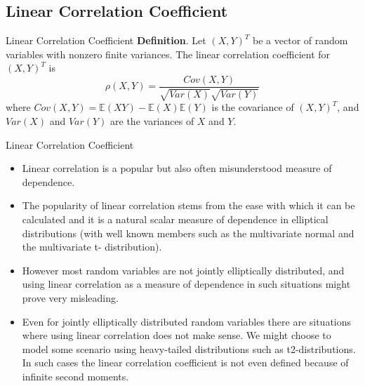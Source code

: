 \documentclass[11pt]{beamer}
\theoremstyle{plain}
\theoremstyle{definition}
\theoremstyle{remark}
\begin{document}
\subsection{Linear Correlation Coefficient}
%
\begin{frame}{Linear Correlation Coefficient}
		\textbf{Definition}. Let $(X,Y)^T$ be a vector of random variables with nonzero finite variances. The linear correlation coefficient 
		for $(X,Y)^T$ is
		\begin{equation}
			\rho(X,Y) = \frac{Cov(X,Y)}{\sqrt{Var(X)}\sqrt{Var(Y)}}
		\end{equation}	
		where $Cov(X,Y) = \mathbb{E}(XY) -\mathbb{E}(X)\mathbb{E}(Y)$ is the covariance of $(X,Y)^T$, and $Var(X)$ and
		$Var(Y)$ are the variances of $X$ and $Y$. %
\end{frame}
%
\begin{frame}{Linear Correlation Coefficient}
   \begin{itemize}
      \item  Linear correlation is a popular but also often misunderstood measure of dependence. 
      \item The popularity of linear correlation stems from the ease with which it can be calculated and it is a natural scalar measure of 
      dependence in elliptical distributions (with well known members such as the multivariate normal and the multivariate t-
      distribution). 
      \item However most random variables are not jointly elliptically distributed, and using linear correlation as a measure of 
      dependence in such situations might prove very misleading. 
      \item Even for jointly elliptically distributed random variables there are 
      situations where using linear correlation does not make sense. We might choose to model some scenario using heavy-tailed 
      distributions such as t2-distributions. In such cases the linear correlation coefficient is not even defined because of infinite second 
      moments.
   \end{itemize}
\end{frame}
%
\end{document}
